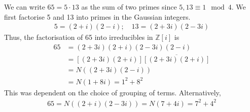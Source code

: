 \begin{example}
	We can write $65 = 5 \cdot 13$ as the sum of two primes since $5, 13 \equiv 1 \mod 4$.
	We first factorise 5 and 13 into primes in the Gaussian integers.
	\begin{align*}
		5 = (2+i)(2-i);\quad 13 = (2+3i)(2-3i)
	\end{align*}
	Thus, the factorisation of 65 into irreducibles in $\mathbb Z[i]$ is
	\begin{align*}
		65 & = (2+3i)(2+i)(2-3i)(2-i)                \\
		   & = [(2+3i)(2+i)]\overline{[(2+3i)(2+i)]} \\
		   & = N((2+3i)(2-i))                        \\
		   & = N(1+8i) = 1^2 + 8^2
	\end{align*}
	This was dependent on the choice of grouping of terms.
	Alternatively,
	\begin{align*}
		65 = N((2+i)(2-3i)) = N(7+4i) = 7^2 + 4^2
	\end{align*}
\end{example}

